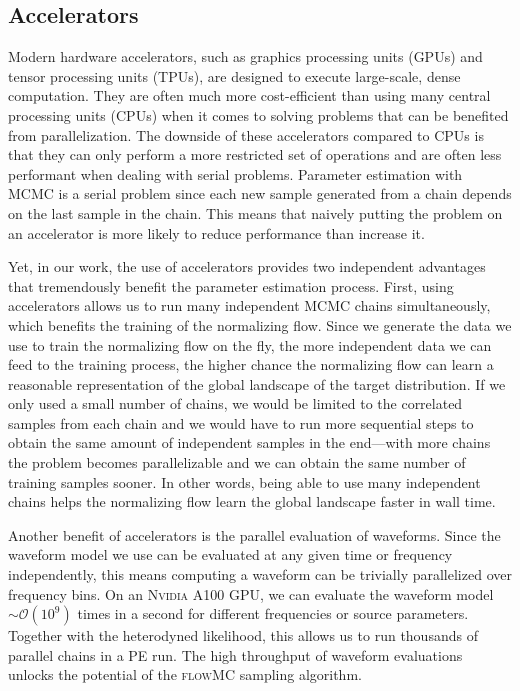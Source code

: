 \documentclass[twocolumn]{aastex631}
\begin{document}
\subsection{Accelerators}
\label{sec:accelerators}

Modern hardware accelerators, such as graphics processing units (GPUs) and
tensor processing units (TPUs), are designed to execute large-scale, dense
computation. They are often much more cost-efficient than using many central
processing units (CPUs) when it comes to solving problems that can be benefited
from parallelization.  The downside of these accelerators compared to CPUs is
that they can only perform a more restricted set of operations and are often
less performant when dealing with serial problems. Parameter estimation with
MCMC is a serial problem since each new sample generated from a chain depends
on the last sample in the chain. This means that naively putting the problem on
an accelerator is more likely to reduce performance than increase it.

Yet, in our work, the use of accelerators provides two independent advantages
that tremendously benefit the parameter estimation process. First, using
accelerators allows us to run many independent MCMC chains simultaneously,
which benefits the training of the normalizing flow. Since we generate the data
we use to train the normalizing flow on the fly, the more independent data we
can feed to the training process, the higher chance the normalizing flow can
learn a reasonable representation of the global landscape of the target
distribution.  If we only used a small number of chains, we would be limited to
the correlated samples from each chain and we would have to run more sequential
steps to obtain the same amount of independent samples in the end---with more
chains the problem becomes parallelizable and we can obtain the same number of
training samples sooner. In other words, being able to use many independent
chains helps the normalizing flow learn the global landscape faster in wall
time.

Another benefit of accelerators is the parallel evaluation of waveforms. Since
the waveform model we use can be evaluated at any given time or frequency
independently, this means computing a waveform can be trivially parallelized
over frequency bins. On an \textsc{Nvidia} A100 GPU, we can evaluate the
waveform model $\sim \mathcal{O}(10^9)$ times in a second for different
frequencies or source parameters. Together with the heterodyned likelihood, this
allows us to run thousands of parallel chains in a PE run. The high throughput
of waveform evaluations unlocks the potential of the \textsc{flowMC} sampling
algorithm.
\end{document}
